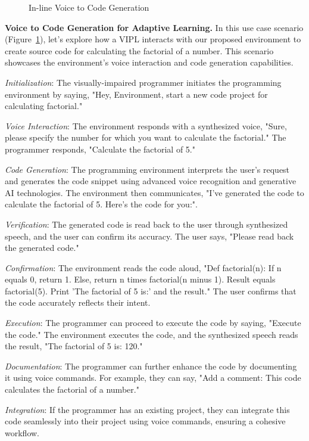 \begin{figure}[t]
\begin{minipage}{.48\textwidth}
\end{minipage}  
\caption{In-line Voice to Code Generation}
\label{thrust3-one}
\end{figure}

{\bf Voice to Code Generation for Adaptive Learning.} In this use case
scenario (Figure~\ref{thrust3-one}), let's explore how a VIPL
interacts with our proposed environment to create
source code for calculating the factorial of a number. This scenario
showcases the environment's voice interaction and code generation
capabilities.

{\em Initialization}: The visually-impaired programmer initiates the
programming environment by saying, "Hey, Environment, start a new code
project for calculating factorial."

{\em Voice Interaction}: The environment responds with a synthesized voice,
"Sure, please specify the number for which you want to calculate the
factorial." The programmer responds, "Calculate the factorial of 5."

{\em Code Generation}: The programming environment interprets the user's
request and generates the code snippet using advanced voice
recognition and generative AI technologies.  The environment then
communicates, "I've generated the code to calculate the factorial of
5. Here's the code for you:".

{\em Verification}: The generated code is read back to the user through synthesized speech, and the user can confirm its accuracy.
The user says, "Please read back the generated code."

{\em Confirmation}: The environment reads the code aloud, "Def factorial(n): If n equals 0, return 1. Else, return n times factorial(n minus 1). Result equals factorial(5). Print 'The factorial of 5 is:' and the result." The user confirms that the code accurately reflects their intent.

{\em Execution}: The programmer can proceed to execute the code by saying, "Execute the code." The environment executes the code, and the synthesized speech reads the result, "The factorial of 5 is: 120."

{\em Documentation}: The programmer can further enhance the code by documenting it using voice commands. For example, they can say, "Add a comment: This code calculates the factorial of a number."

{\em Integration}: If the programmer has an existing project, they can
integrate this code seamlessly into their project using voice
commands, ensuring a cohesive workflow.

